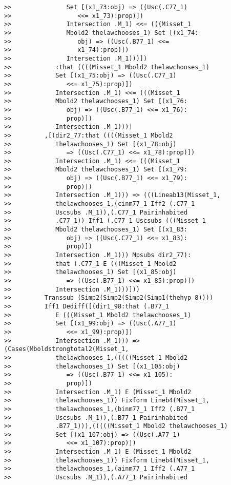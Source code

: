 \documentclass[12pt]{article}
\begin{document}
\begin{verbatim}
>>               Set [(x1_73:obj) => ((Usc(.C77_1)
>>                  <<= x1_73):prop)])
>>               Intersection .M_1) <<= (((Misset_1
>>               Mbold2 thelawchooses_1) Set [(x1_74:
>>                  obj) => ((Usc(.B77_1) <<=
>>                  x1_74):prop)])
>>               Intersection .M_1)))])
>>            :that ((((Misset_1 Mbold2 thelawchooses_1)
>>            Set [(x1_75:obj) => ((Usc(.C77_1)
>>               <<= x1_75):prop)])
>>            Intersection .M_1) <<= (((Misset_1
>>            Mbold2 thelawchooses_1) Set [(x1_76:
>>               obj) => ((Usc(.B77_1) <<= x1_76):
>>               prop)])
>>            Intersection .M_1)))]
>>         ,[(dir2_77:that ((((Misset_1 Mbold2
>>            thelawchooses_1) Set [(x1_78:obj)
>>               => ((Usc(.C77_1) <<= x1_78):prop)])
>>            Intersection .M_1) <<= (((Misset_1
>>            Mbold2 thelawchooses_1) Set [(x1_79:
>>               obj) => ((Usc(.B77_1) <<= x1_79):
>>               prop)])
>>            Intersection .M_1))) => (((Lineab13(Misset_1,
>>            thelawchooses_1,(cinm77_1 Iff2 (.C77_1
>>            Uscsubs .M_1)),(.C77_1 Pairinhabited
>>            .C77_1)) Iff1 (.C77_1 Uscsubs (((Misset_1
>>            Mbold2 thelawchooses_1) Set [(x1_83:
>>               obj) => ((Usc(.C77_1) <<= x1_83):
>>               prop)])
>>            Intersection .M_1))) Mpsubs dir2_77):
>>            that (.C77_1 E (((Misset_1 Mbold2
>>            thelawchooses_1) Set [(x1_85:obj)
>>               => ((Usc(.B77_1) <<= x1_85):prop)])
>>            Intersection .M_1)))]))
>>         Transsub (Simp2(Simp2(Simp2(Simp1(thehyp_8))))
>>         Iff1 Dediff([(dir1_98:that (.B77_1
>>            E (((Misset_1 Mbold2 thelawchooses_1)
>>            Set [(x1_99:obj) => ((Usc(.A77_1)
>>               <<= x1_99):prop)])
>>            Intersection .M_1))) => (Cases(Mboldstrongtotal2(Misset_1,
>>            thelawchooses_1,(((((Misset_1 Mbold2
>>            thelawchooses_1) Set [(x1_105:obj)
>>               => ((Usc(.B77_1) <<= x1_105):
>>               prop)])
>>            Intersection .M_1) E (Misset_1 Mbold2
>>            thelawchooses_1)) Fixform Lineb4(Misset_1,
>>            thelawchooses_1,(binm77_1 Iff2 (.B77_1
>>            Uscsubs .M_1)),(.B77_1 Pairinhabited
>>            .B77_1))),(((((Misset_1 Mbold2 thelawchooses_1)
>>            Set [(x1_107:obj) => ((Usc(.A77_1)
>>               <<= x1_107):prop)])
>>            Intersection .M_1) E (Misset_1 Mbold2
>>            thelawchooses_1)) Fixform Lineb4(Misset_1,
>>            thelawchooses_1,(ainm77_1 Iff2 (.A77_1
>>            Uscsubs .M_1)),(.A77_1 Pairinhabited

\end{verbatim}
\end{document}
